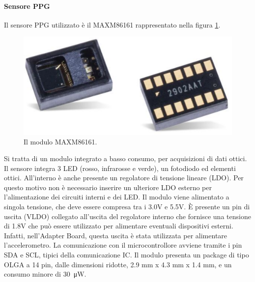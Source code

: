 \paragraph{Sensore PPG} Il sensore PPG utilizzato è il MAXM86161 rappresentato nella figura \ref{fig:ImmagineMAXM86161}.
\begin{figure}[tb]
	\centering
	\includegraphics[width=0.7\linewidth]{ImageFiles/Hardware/ImmagineMAXM86161}
	\caption{Il modulo MAXM86161.}
	\label{fig:ImmagineMAXM86161}
\end{figure}
Si tratta di un modulo integrato a basso consumo, per acquisizioni di dati ottici. Il sensore integra 3 LED (rosso, infrarosse e verde), un fotodiodo ed elementi ottici. All'interno è anche presente un regolatore di tensione lineare (LDO). Per questo motivo non è necessario inserire un ulteriore LDO esterno per l'alimentazione dei circuiti interni e dei LED. Il modulo viene alimentato a singola tensione, che deve essere compresa tra i 3.0V e 5.5V. \`E presente un pin di uscita (VLDO) collegato all'uscita del regolatore interno che fornisce una tensione di 1.8V che può essere utilizzato per alimentare eventuali dispositivi esterni. Infatti, nell'Adapter Board, questa uscita è stata utilizzata per alimentare l'accelerometro. 
La comunicazione con il microcontrollore avviene tramite i pin SDA e SCL, tipici della comunicazione IC. Il modulo presenta un package di tipo OLGA a 14 pin, dalle dimensioni ridotte, 2.9 mm x 4.3 mm x 1.4 mm, e un consumo minore di \SI{30}{\micro\watt}.

